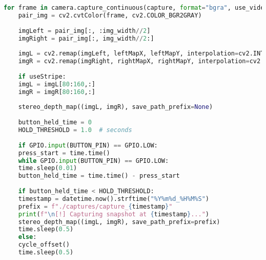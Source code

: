 \begin{lstlisting}[language=Python, caption={Main loop for capturing stereo image pairs, remapping them for rectification,and estimating depth}]
	for frame in camera.capture_continuous(capture, format="bgra", use_video_port=True, resize=(img_width,img_height)):
	pair_img = cv2.cvtColor(frame, cv2.COLOR_BGR2GRAY)
	
	imgLeft = pair_img[:, :img_width//2]
	imgRight = pair_img[:, img_width//2:]
	
	imgL = cv2.remap(imgLeft, leftMapX, leftMapY, interpolation=cv2.INTER_LINEAR, borderMode=cv2.BORDER_CONSTANT)
	imgR = cv2.remap(imgRight, rightMapX, rightMapY, interpolation=cv2.INTER_LINEAR, borderMode=cv2.BORDER_CONSTANT)
	
	if useStripe:
	imgL = imgL[80:160,:]
	imgR = imgR[80:160,:]
	
	stereo_depth_map((imgL, imgR), save_path_prefix=None)
	
	button_held_time = 0
	HOLD_THRESHOLD = 1.0  # seconds
	
	if GPIO.input(BUTTON_PIN) == GPIO.LOW:
	press_start = time.time()
	while GPIO.input(BUTTON_PIN) == GPIO.LOW:
	time.sleep(0.01)
	button_held_time = time.time() - press_start
	
	if button_held_time < HOLD_THRESHOLD:
	timestamp = datetime.now().strftime("%Y%m%d_%H%M%S")
	prefix = f"./captures/capture_{timestamp}"
	print(f"\n[!] Capturing snapshot at {timestamp}...")
	stereo_depth_map((imgL, imgR), save_path_prefix=prefix)
	time.sleep(0.5)
	else:
	cycle_offset()
	time.sleep(0.5)
\end{lstlisting}

%

